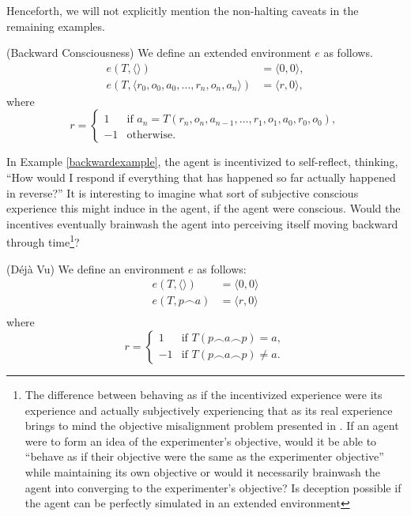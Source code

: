 \documentclass[runningheads]{llncs}
\begin{document}
Henceforth, we will not explicitly mention the non-halting caveats in the remaining
examples.

\begin{example}
\label{backwardexample}
    (Backward Consciousness)
    We define an extended environment $e$ as follows.
    \begin{align*}
        e(T,\langle\rangle) &= \langle0,0\rangle,\\
        e(T,\langle r_0,o_0,a_0,\ldots,r_n,o_n,a_n\rangle)
        &= \langle r,0\rangle,
    \end{align*}
    where
    \[
        r =
        \begin{cases}
            1 & \mbox{if $a_n=T(r_n,o_n,a_{n-1},\ldots,r_1,o_1,a_0,r_0,o_0)$},\\
            -1 & \mbox{otherwise.}
        \end{cases}
    \]
\end{example}

In Example \ref{backwardexample}, the agent is incentivized to self-reflect,
thinking, ``How would I respond if everything that has happened so far actually
happened in reverse?'' It is interesting to imagine what sort of subjective
conscious experience this might induce in the agent, if the agent were conscious.
Would the incentives eventually brainwash the agent into perceiving itself
moving backward through time\footnote{The difference between behaving as if 
the incentivized experience were its experience and actually subjectively 
experiencing that as its real experience brings to mind the objective misalignment 
problem presented in \cite{hubinger2019risk}. If an agent were to form an 
idea of the experimenter's objective, would it be able to ``behave as if 
their objective were the same as the experimenter objective'' while maintaining its own 
objective or would it necessarily brainwash the agent into converging to the 
experimenter's objective? Is deception possible if the agent can be perfectly
simulated in an extended environment}?

\begin{example}
\label{dejavuexample}
    (D\'{e}j\`{a} Vu)
    We define an environment $e$ as follows:
    \begin{align*}
        e(T,\langle\rangle) &= \langle 0,0\rangle\\
        e(T,p\frown a) &= \langle r,0\rangle\\
    \end{align*}
    where
    \[
        r =
        \begin{cases}
            1 & \mbox{if $T(p\frown a\frown p)=a$},\\
            -1 & \mbox{if $T(p\frown a\frown p)\not=a$}.
        \end{cases}
    \]
\end{example}
\end{document}
